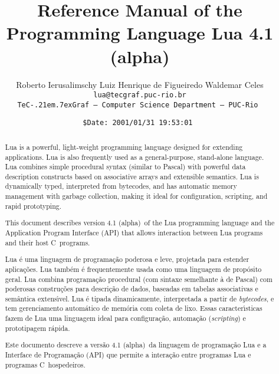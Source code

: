\documentclass[11pt]{article}
\def\tecgraf{{\sf TeC\kern-.21em\lower.7ex\hbox{Graf}}}
\newcommand{\Version}{4.1 (alpha)}
\begin{document}
\title{\Large\bf Reference Manual of the Programming Language Lua \Version}

\author{%
Roberto Ierusalimschy\quad
Luiz Henrique de Figueiredo\quad
Waldemar Celes
\vspace{1.0ex}\\
\smallskip
\small\tt lua@tecgraf.puc-rio.br
\vspace{2.0ex}\\
\tecgraf\ --- Computer Science Department --- PUC-Rio
}

\date{{\small \tt\$Date: 2001/01/31 19:53:01 $ $}}

\maketitle

\pagestyle{plain}

\begin{abstract}
\noindent
Lua is a powerful, light-weight programming language
designed for extending applications.
Lua is also frequently used as a general-purpose, stand-alone language.
Lua combines simple procedural syntax
(similar to Pascal)
with
powerful data description constructs
based on associative arrays and extensible semantics.
Lua is
dynamically typed,
interpreted from bytecodes,
and has automatic memory management with garbage collection,
making it ideal for
configuration,
scripting,
and
rapid prototyping.

This document describes version \Version\ of the Lua programming language
and the Application Program Interface (API)
that allows interaction between Lua programs and their host C~programs.
\end{abstract}

\def\abstractname{Resumo}
\begin{abstract}
\noindent
Lua \'e uma linguagem de programa\c{c}\~ao
poderosa e leve,
projetada para estender aplica\c{c}\~oes.
Lua tamb\'em \'e frequentemente usada como uma linguagem de prop\'osito geral.
Lua combina programa\c{c}\~ao procedural
(com sintaxe semelhante \`a de Pascal)
com
poderosas constru\c{c}\~oes para descri\c{c}\~ao de dados,
baseadas em tabelas associativas e sem\^antica extens\'\i vel.
Lua \'e
tipada dinamicamente,
interpretada a partir de \emph{bytecodes},
e tem gerenciamento autom\'atico de mem\'oria com coleta de lixo.
Essas caracter\'{\i}sticas fazem de Lua uma linguagem ideal para
configura\c{c}\~ao,
automa\c{c}\~ao (\emph{scripting})
e prototipagem r\'apida.

Este documento descreve a vers\~ao \Version\ da linguagem de
programa\c{c}\~ao Lua e a Interface de Programa\c{c}\~ao (API) que permite
a intera\c{c}\~ao entre programas Lua e programas C~hospedeiros.
\end{abstract}
\end{document}
